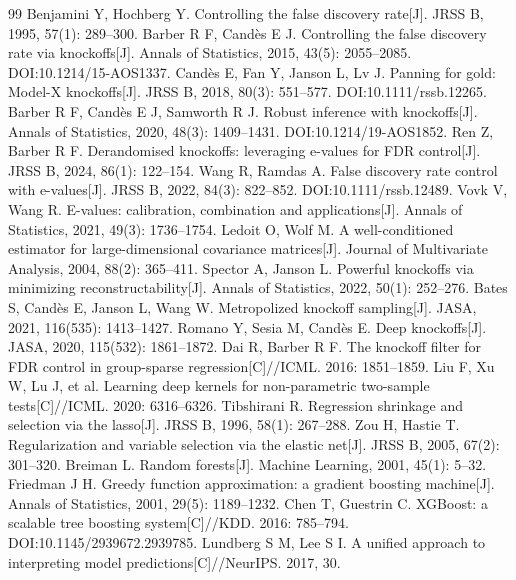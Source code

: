 \documentclass[UTF8,12pt,a4paper]{ctexart}
\begin{document}
\newpage
\renewcommand{\refname}{12、主要参考文献}
\scriptsize
{}
\begin{thebibliography}{99}
 Benjamini Y, Hochberg Y. Controlling the false discovery rate[J]. JRSS B, 1995, 57(1): 289--300.
 Barber R F, Candès E J. Controlling the false discovery rate via knockoffs[J]. Annals of Statistics, 2015, 43(5): 2055--2085. DOI:10.1214/15-AOS1337.
 Candès E, Fan Y, Janson L, Lv J. Panning for gold: Model-X knockoffs[J]. JRSS B, 2018, 80(3): 551--577. DOI:10.1111/rssb.12265.
 Barber R F, Candès E J, Samworth R J. Robust inference with knockoffs[J]. Annals of Statistics, 2020, 48(3): 1409--1431. DOI:10.1214/19-AOS1852.
 Ren Z, Barber R F. Derandomised knockoffs: leveraging e-values for FDR control[J]. JRSS B, 2024, 86(1): 122--154.
 Wang R, Ramdas A. False discovery rate control with e-values[J]. JRSS B, 2022, 84(3): 822--852. DOI:10.1111/rssb.12489.
 Vovk V, Wang R. E-values: calibration, combination and applications[J]. Annals of Statistics, 2021, 49(3): 1736--1754.
 Ledoit O, Wolf M. A well-conditioned estimator for large-dimensional covariance matrices[J]. Journal of Multivariate Analysis, 2004, 88(2): 365--411.
 Spector A, Janson L. Powerful knockoffs via minimizing reconstructability[J]. Annals of Statistics, 2022, 50(1): 252--276.
 Bates S, Candès E, Janson L, Wang W. Metropolized knockoff sampling[J]. JASA, 2021, 116(535): 1413--1427.
 Romano Y, Sesia M, Candès E. Deep knockoffs[J]. JASA, 2020, 115(532): 1861--1872.
 Dai R, Barber R F. The knockoff filter for FDR control in group-sparse regression[C]//ICML. 2016: 1851--1859.
 Liu F, Xu W, Lu J, et al. Learning deep kernels for non-parametric two-sample tests[C]//ICML. 2020: 6316--6326.
 Tibshirani R. Regression shrinkage and selection via the lasso[J]. JRSS B, 1996, 58(1): 267--288.
 Zou H, Hastie T. Regularization and variable selection via the elastic net[J]. JRSS B, 2005, 67(2): 301--320.
 Breiman L. Random forests[J]. Machine Learning, 2001, 45(1): 5--32.
 Friedman J H. Greedy function approximation: a gradient boosting machine[J]. Annals of Statistics, 2001, 29(5): 1189--1232.
 Chen T, Guestrin C. XGBoost: a scalable tree boosting system[C]//KDD. 2016: 785--794. DOI:10.1145/2939672.2939785.
 Lundberg S M, Lee S I. A unified approach to interpreting model predictions[C]//NeurIPS. 2017, 30.

\end{thebibliography}
\end{document}
